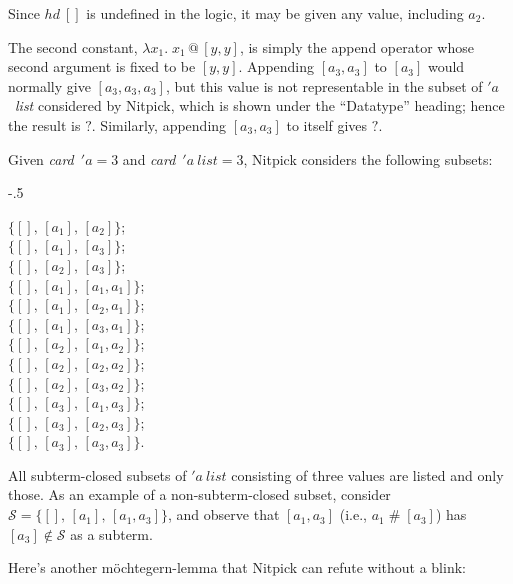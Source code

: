 \documentclass[a4paper,12pt]{article}
\def\unk{{?}}
\begin{document}
Since $\mathit{hd}~[]$ is undefined in the logic, it may be given any value,
including $a_2$.

The second constant, $\lambda x_1.\; x_1 \mathbin{@} [y, y]$, is simply the
append operator whose second argument is fixed to be $[y, y]$. Appending $[a_3,
a_3]$ to $[a_3]$ would normally give $[a_3, a_3, a_3]$, but this value is not
representable in the subset of $'a$~\textit{list} considered by Nitpick, which
is shown under the ``Datatype'' heading; hence the result is $\unk$. Similarly,
appending $[a_3, a_3]$ to itself gives $\unk$.

Given \textit{card}~$'a = 3$ and \textit{card}~$'a~\textit{list} = 3$, Nitpick
considers the following subsets:

\kern-.5\smallskipamount %

\prew
\begin{multicols}{3}
$\{[],\, [a_1],\, [a_2]\}$; \\
$\{[],\, [a_1],\, [a_3]\}$; \\
$\{[],\, [a_2],\, [a_3]\}$; \\
$\{[],\, [a_1],\, [a_1, a_1]\}$; \\
$\{[],\, [a_1],\, [a_2, a_1]\}$; \\
$\{[],\, [a_1],\, [a_3, a_1]\}$; \\
$\{[],\, [a_2],\, [a_1, a_2]\}$; \\
$\{[],\, [a_2],\, [a_2, a_2]\}$; \\
$\{[],\, [a_2],\, [a_3, a_2]\}$; \\
$\{[],\, [a_3],\, [a_1, a_3]\}$; \\
$\{[],\, [a_3],\, [a_2, a_3]\}$; \\
$\{[],\, [a_3],\, [a_3, a_3]\}$.
\end{multicols}
\postw

\smallskipamount %

All subterm-closed subsets of $'a~\textit{list}$ consisting of three values
are listed and only those. As an example of a non-subterm-closed subset,
consider $\mathcal{S} = \{[],\, [a_1],\,\allowbreak [a_1, a_3]\}$, and observe
that $[a_1, a_3]$ (i.e., $a_1 \mathbin{\#} [a_3]$) has $[a_3] \notin
\mathcal{S}$ as a subterm.

Here's another m\"ochtegern-lemma that Nitpick can refute without a blink:
\end{document}
